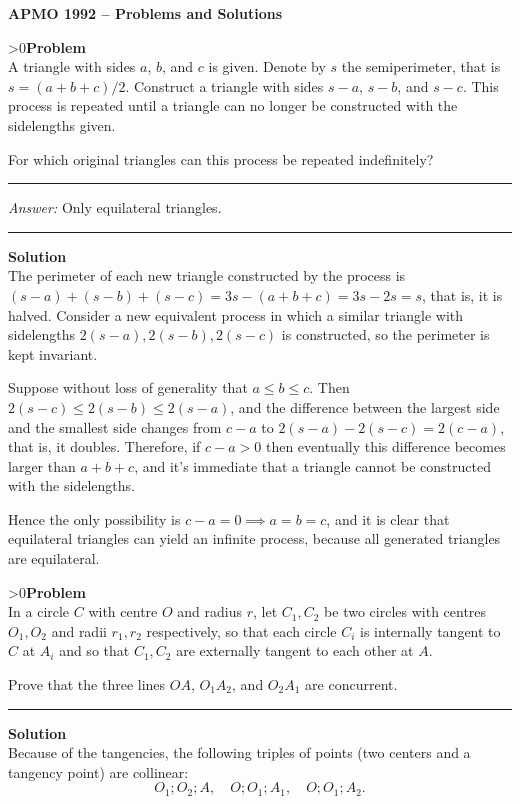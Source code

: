 \documentclass[12pt,oneside,a4paper]{book}
\newcounter{probnum}
\newcounter{solnum}
\newcommand{\prob}{\ifnum\value{probnum}>0\newpage\fi\setcounter{solnum}{0}\stepcounter{probnum}\textbf{Problem \theprobnum}\\}
\newcommand{\ans}{\medskip\hrule\medbreak\emph{Answer: }}
\newcommand{\sol}{\medskip\hrule\medbreak\textbf{Solution}\\}
\begin{document}
\begin{center}
\textbf{\large APMO 1992 -- Problems and Solutions}
\end{center}

\prob A triangle with sides $a$, $b$, and $c$ is given. Denote by $s$ the semiperimeter, that is $s= (a+b+c)/2$. Construct a triangle with sides $s-a$, $s-b$, and $s-c$. This process is repeated until a triangle can no longer be constructed with the sidelengths given.

For which original triangles can this process be repeated indefinitely?

\ans Only equilateral triangles.

\sol
The perimeter of each new triangle constructed by the process is $(s-a)+(s-b)+(s-c) = 3s-(a+b+c) = 3s-2s=s$, that is, it is halved. Consider a new equivalent process in which a similar triangle with sidelengths $2(s-a),2(s-b),2(s-c)$ is constructed, so the perimeter is kept invariant.

Suppose without loss of generality that $a\le b\le c$. Then $2(s-c) \le 2(s-b) \le 2(s-a)$, and the difference between the largest side and the smallest side changes from $c-a$ to $2(s-a) - 2(s-c) = 2(c-a)$, that is, it doubles. Therefore, if $c-a>0$ then eventually this difference becomes larger than $a+b+c$, and it's immediate that a triangle cannot be constructed with the sidelengths.

Hence the only possibility is $c-a=0\implies a=b=c$, and it is clear that equilateral triangles can yield an infinite process, because all generated triangles are equilateral. 

\prob In a circle $C$ with centre $O$ and radius $r$, let $C_1,C_2$ be two circles with centres $O_1,O_2$ and radii $r_1,r_2$ respectively, so that each circle $C_i$ is internally tangent to $C$ at $A_i$ and so that $C_1,C_2$ are externally tangent to each other at $A$.

Prove that the three lines $OA$, $O_1A_2$, and $O_2A_1$ are concurrent.

\sol
Because of the tangencies, the following triples of points (two centers and a tangency point) are collinear:
\[O_1;O_2;A,\quad O;O_1;A_1, \quad O;O_1;A_2.\]
\end{document}
